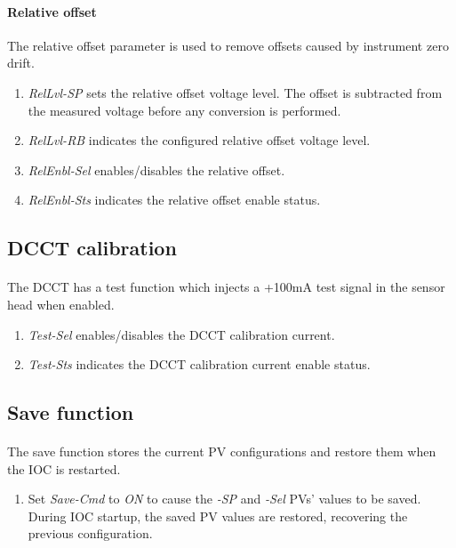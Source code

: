 \documentclass[openany]{article}
\begin{document}
		\paragraph{Relative offset} The relative offset parameter is used to remove offsets caused by instrument zero drift.

			\begin{enumerate}
				\item \emph{RelLvl-SP} sets the relative offset voltage level. The offset is subtracted from the measured voltage before any conversion is performed.
				\item \emph{RelLvl-RB} indicates the configured relative offset voltage level.
				\item \emph{RelEnbl-Sel} enables/disables the relative offset.
				\item \emph{RelEnbl-Sts} indicates the relative offset enable status.
			\end{enumerate}

	\subsection{DCCT calibration}

		\paragraph{} The DCCT has a test function which injects a +100mA test signal in the sensor head when enabled.

			\begin{enumerate}
				\item \emph{Test-Sel} enables/disables the DCCT calibration current.
				\item \emph{Test-Sts} indicates the DCCT calibration current enable status.
			\end{enumerate}

	\subsection{Save function}

		\paragraph{} The save function stores the current PV configurations and restore them when the IOC is restarted.

			\begin{enumerate}
				\item Set \emph{Save-Cmd} to \emph{ON} to cause the \emph{-SP} and \emph{-Sel} PVs' values to be saved. During IOC startup, the saved PV values are restored, recovering the previous configuration.
			\end{enumerate}
\end{document}
